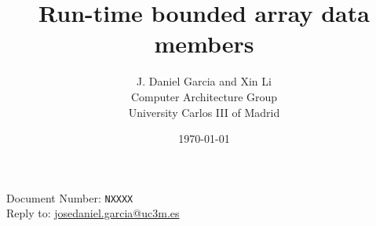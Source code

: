 \documentclass[10pt,a4paper,oneside,final,notitlepage,openright]{article}%
\begin{document}
\begin{flushright}
Document Number: \texttt{NXXXX}\\
Reply to: \url{josedaniel.garcia@uc3m.es}
\end{flushright}

\title{Run-time bounded array data members}
\author{J. Daniel Garcia and Xin Li\\
Computer Architecture Group\\
University Carlos III of Madrid
}
\date{\today}

\begingroup
\let\newpage\relax%
\maketitle
\endgroup








\end{document}
